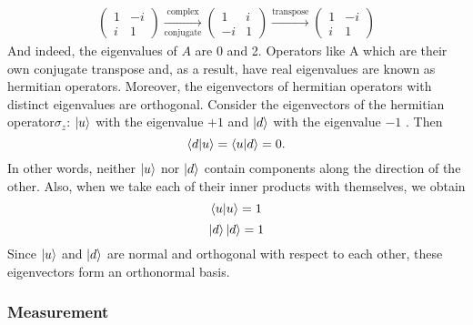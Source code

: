 \documentclass{article}
\begin{document}
  \begin{gather}
    \begin{pmatrix}
      1 & -i \\
      i &  1
    \end{pmatrix}
    \xrightarrow[\text{conjugate}]{\text{complex}}
    \begin{pmatrix}
      1 &  i \\
      -i &  1
    \end{pmatrix}
    \xrightarrow[\text{ }]{\text{transpose}}
    \begin{pmatrix}
      1 &  -i \\
      i &  1
    \end{pmatrix}
  \end{gather}
  And indeed, the eigenvalues of \(A\) are 0 and 2. Operators like A which
  are their own conjugate transpose and, as a result, have real eigenvalues are
  known as hermitian operators. Moreover, the eigenvectors of hermitian operators
  with distinct eigenvalues are orthogonal. Consider the eigenvectors
  of the hermitian operator\(\sigma_z\): \(\ket{u}\)
  with the eigenvalue \(+1\) and \(\ket{d}\) with the eigenvalue \(-1\) . Then
  \[\bra{d}\ket{u}= \bra{u}\ket{d} = 0.\]
  In other words, neither \(\ket{u}\) nor \(\ket{d}\) contain components along
  the direction of the other. Also, when we take each of their inner products
  with themselves, we obtain
  \[\bra{u}\ket{u} = 1\]
  \[\ket{d}\ket{d} = 1\]
  Since \(\ket{u}\) and \(\ket{d}\) are normal and orthogonal with respect to
  each other, these eigenvectors form an orthonormal basis.
\subsubsection{Measurement}
\end{document}
